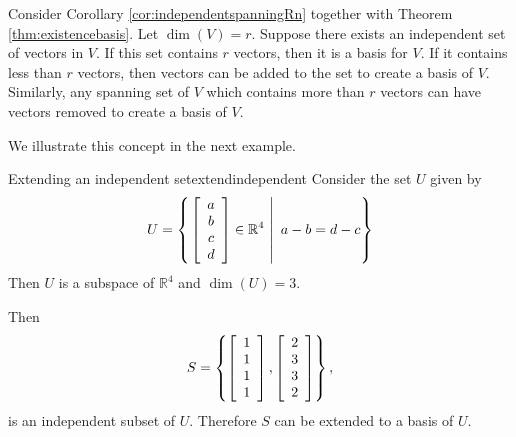 Consider Corollary \ref{cor:independentspanningRn} together with Theorem \ref{thm:existencebasis}. Let $\dim(V) = r$. Suppose there exists an independent set of vectors in $V$. If this set contains $r$ vectors, then it is a basis for $V$. If it contains less than $r$ vectors, then vectors can be added to the set to create a basis of $V$. Similarly, any spanning set of $V$ which contains more than $r$ vectors can have vectors removed to create a basis of $V$.

We illustrate this concept in the next example.

\begin{example}{Extending an independent set}{extendindependent}
Consider the set $U$ given by 
\[ U=\left\{ \left.\left[\begin{array}{c} a\\ b\\ c\\ d\end{array}\right]
\in\mathbb{R}^4 ~\right|~ a-b=d-c \right\}\]
Then $U$ is a subspace of $\mathbb{R}^4$ and $\dim(U)=3$.

Then
\[S=\left\{ 
\left[\begin{array}{c} 1\\ 1\\ 1\\ 1\end{array}\right],
\left[\begin{array}{c} 2\\ 3\\ 3\\ 2\end{array}\right] \right\},\]
is an independent subset of $U$.
Therefore $S$ can be extended to a basis of $U$.
\end{example}

